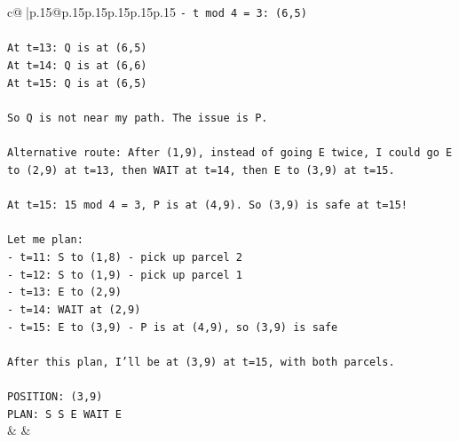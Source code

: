 \documentclass{article}
\begin{document}
{\begin{supertabular}{c@{$\;$}|p{.15\linewidth}@{}p{.15\linewidth}p{.15\linewidth}p{.15\linewidth}p{.15\linewidth}p{.15\linewidth}}
{{{\texttt{{-} t mod 4 = 3: (6,5)} \\
\\ 
\texttt{At t=13: Q is at (6,5)} \\
\texttt{At t=14: Q is at (6,6)} \\
\texttt{At t=15: Q is at (6,5)} \\
\\ 
\texttt{So Q is not near my path. The issue is P.} \\
\\ 
\texttt{Alternative route: After (1,9), instead of going E twice, I could go E to (2,9) at t=13, then WAIT at t=14, then E to (3,9) at t=15.} \\
\\ 
\texttt{At t=15: 15 mod 4 = 3, P is at (4,9). So (3,9) is safe at t=15!} \\
\\ 
\texttt{Let me plan:} \\
\texttt{{-} t=11: S to (1,8) {-} pick up parcel 2} \\
\texttt{{-} t=12: S to (1,9) {-} pick up parcel 1} \\
\texttt{{-} t=13: E to (2,9)} \\
\texttt{{-} t=14: WAIT at (2,9)} \\
\texttt{{-} t=15: E to (3,9) {-} P is at (4,9), so (3,9) is safe} \\
\\ 
\texttt{After this plan, I'll be at (3,9) at t=15, with both parcels.} \\
\\ 
\texttt{POSITION: (3,9)} \\
\texttt{PLAN: S S E WAIT E} \\
            }
        }
    }
    & & \\ \\


\end{supertabular}}
\end{document}
